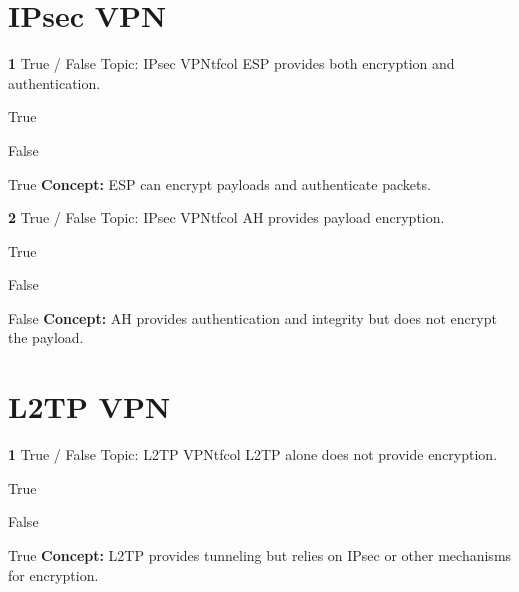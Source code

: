 \documentclass[10pt,a4paper]{article}
\begin{document}
\section{IPsec VPN}
\begin{qcard}{\color{white}\textbf{1} \hfill \small True / False \textbar{} Topic: IPsec VPN}{tfcol}
ESP provides both encryption and authentication.

\begin{qoptions}
\item True
\item False
\end{qoptions}
\begin{explainbox}{True}
\textbf{Concept:} ESP can encrypt payloads and authenticate packets.
\end{explainbox}
\end{qcard}

\begin{qcard}{\color{white}\textbf{2} \hfill \small True / False \textbar{} Topic: IPsec VPN}{tfcol}
AH provides payload encryption.

\begin{qoptions}
\item True
\item False
\end{qoptions}
\begin{explainbox}{False}
\textbf{Concept:} AH provides authentication and integrity but does not encrypt the payload.
\end{explainbox}
\end{qcard}

\section{L2TP VPN}
\begin{qcard}{\color{white}\textbf{1} \hfill \small True / False \textbar{} Topic: L2TP VPN}{tfcol}
L2TP alone does not provide encryption.

\begin{qoptions}
\item True
\item False
\end{qoptions}
\begin{explainbox}{True}
\textbf{Concept:} L2TP provides tunneling but relies on IPsec or other mechanisms for encryption.
\end{explainbox}
\end{qcard}
\end{document}

